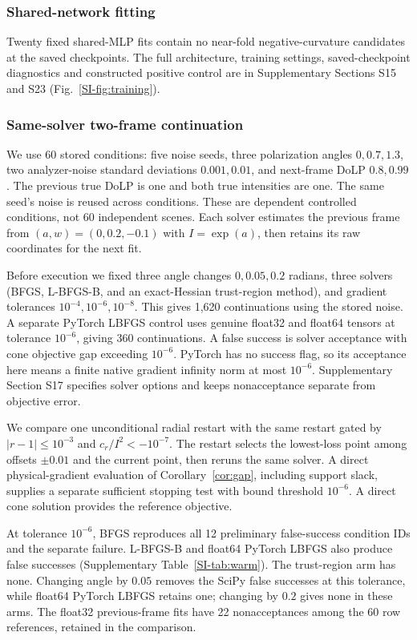 \documentclass[10pt,a4paper]{article}
\begin{document}
\subsubsection{Shared-network fitting}
Twenty fixed shared-MLP fits contain no near-fold negative-curvature candidates at the saved checkpoints. The full architecture, training settings, saved-checkpoint diagnostics and constructed positive control are in Supplementary Sections S15 and S23 (Fig.~\ref{SI-fig:training}).

\subsubsection{Same-solver two-frame continuation}
\label{sec:warmexperiment}
We use 60 stored conditions: five noise seeds, three polarization angles $0,0.7,1.3$, two analyzer-noise standard deviations $0.001,0.01$, and next-frame DoLP $0.8,0.99$. The previous true DoLP is one and both true intensities are one. The same seed's noise is reused across conditions. These are dependent controlled conditions, not 60 independent scenes. Each solver estimates the previous frame from $(a,w)=(0,0.2,-0.1)$ with $I=\exp(a)$, then retains its raw coordinates for the next fit.

Before execution we fixed three angle changes $0,0.05,0.2$ radians, three solvers (BFGS, L-BFGS-B, and an exact-Hessian trust-region method), and gradient tolerances $10^{-4},10^{-6},10^{-8}$. This gives 1,620 continuations using the stored noise. A separate PyTorch LBFGS control uses genuine float32 and float64 tensors at tolerance $10^{-6}$, giving 360 continuations. A false success is solver acceptance with cone objective gap exceeding $10^{-6}$. PyTorch has no success flag, so its acceptance here means a finite native gradient infinity norm at most $10^{-6}$. Supplementary Section S17 specifies solver options and keeps nonacceptance separate from objective error.

We compare one unconditional radial restart with the same restart gated by $|r-1|\leq10^{-3}$ and $c_r/I^2<-10^{-7}$. The restart selects the lowest-loss point among offsets $\pm0.01$ and the current point, then reruns the same solver. A direct physical-gradient evaluation of Corollary~\ref{cor:gap}, including support slack, supplies a separate sufficient stopping test with bound threshold $10^{-6}$. A direct cone solution provides the reference objective.



At tolerance $10^{-6}$, BFGS reproduces all 12 preliminary false-success condition IDs and the separate failure. L-BFGS-B and float64 PyTorch LBFGS also produce false successes (Supplementary Table~\ref{SI-tab:warm}). The trust-region arm has none. Changing angle by $0.05$ removes the SciPy false successes at this tolerance, while float64 PyTorch LBFGS retains one; changing by $0.2$ gives none in these arms. The float32 previous-frame fits have 22 nonacceptances among the 60 row references, retained in the comparison.
\end{document}
